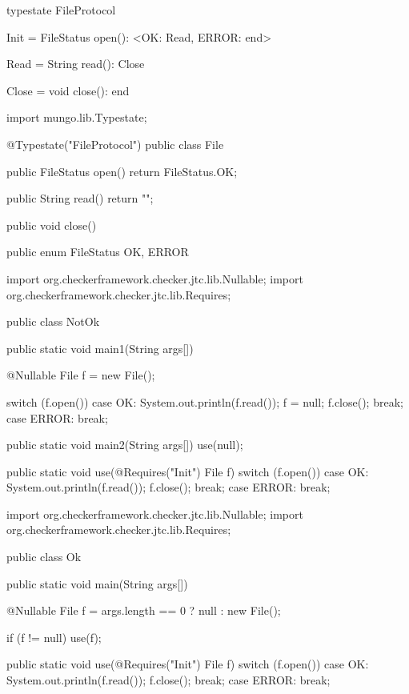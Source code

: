 \begin{code}
typestate FileProtocol {

  Init = {
    FileStatus open(): <OK: Read, ERROR: end>
  }

  Read = {
    String read(): Close
  }

  Close = {
    void close(): end
  }

}\end{code}

\begin{code}
import mungo.lib.Typestate;

@Typestate("FileProtocol")
public class File {

  public FileStatus open() {
    return FileStatus.OK;
  }

  public String read() {
    return "";
  }

  public void close() {

  }

}\end{code}

\begin{code}
public enum FileStatus {
  OK, ERROR
}\end{code}

\begin{code}
import org.checkerframework.checker.jtc.lib.Nullable;
import org.checkerframework.checker.jtc.lib.Requires;

public class NotOk {
  public static void main1(String args[]) {
    @Nullable File f = new File();

    switch (f.open()) {
      case OK:
        System.out.println(f.read());
        f = null;
        f.close();
        break;
      case ERROR:
        break;
    }
  }

  public static void main2(String args[]) {
    use(null);
  }

  public static void use(@Requires("Init") File f) {
    switch (f.open()) {
      case OK:
        System.out.println(f.read());
        f.close();
        break;
      case ERROR:
        break;
    }
  }
}\end{code}

\begin{code}
import org.checkerframework.checker.jtc.lib.Nullable;
import org.checkerframework.checker.jtc.lib.Requires;

public class Ok {
  public static void main(String args[]) {
    @Nullable File f = args.length == 0 ? null : new File();

    if (f != null) {
      use(f);
    }
  }

  public static void use(@Requires("Init") File f) {
    switch (f.open()) {
      case OK:
        System.out.println(f.read());
        f.close();
        break;
      case ERROR:
        break;
    }
  }
}\end{code}

